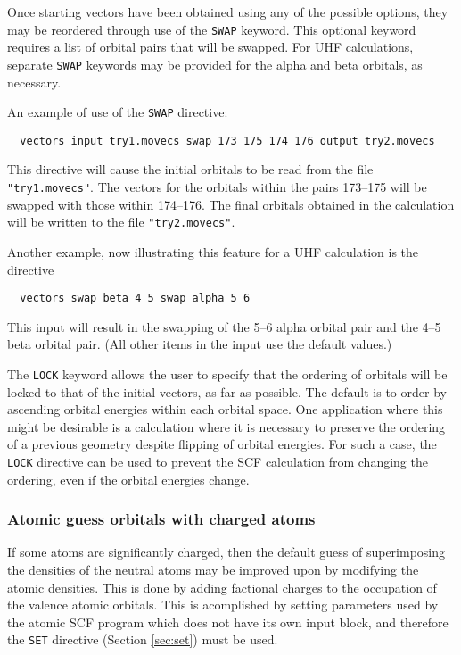 Once starting vectors have been obtained using any of the possible
options, they may be reordered through use of the \verb+SWAP+ keyword.
This optional keyword requires a list of orbital pairs that will be
swapped.  For UHF calculations, separate \verb+SWAP+ keywords may be
provided for the alpha and beta orbitals, as necessary.  

An example of use of the \verb+SWAP+ directive:
\begin{verbatim}
  vectors input try1.movecs swap 173 175 174 176 output try2.movecs
\end{verbatim}
This directive will cause the initial orbitals to be read from the
file \verb+"try1.movecs"+.  The vectors for the orbitals within the
pairs 173--175 will be swapped with those within 174--176.  The final
orbitals obtained in the calculation will be written to the file
\verb+"try2.movecs"+.

Another example, now illustrating this feature for a UHF calculation
is the directive
\begin{verbatim}
  vectors swap beta 4 5 swap alpha 5 6
\end{verbatim}
This input will result in the swapping of the 5--6 alpha orbital pair and 
the 4--5 beta orbital pair.  (All other items in the input use the
default values.)

The \verb+LOCK+ keyword allows the user to specify that the ordering
of orbitals will be locked to that of the initial vectors, as far as
possible. The default is to order by ascending orbital energies within
each orbital space. One application where this might be desirable is a
calculation where it is necessary to preserve the ordering of a
previous geometry despite flipping of orbital energies.  For such a
case, the \verb+LOCK+ directive can be used to prevent the SCF
calculation from changing the ordering, even if the orbital energies
change.

\subsubsection{Atomic guess orbitals with charged atoms}

If some atoms are significantly charged, then the default guess of
superimposing the densities of the neutral atoms may be improved upon
by modifying the atomic densities.  This is done by adding factional
charges to the occupation of the valence atomic orbitals.  This is
acomplished by setting parameters used by the atomic SCF program which
does not have its own input block, and therefore the \verb+SET+
directive (Section \ref{sec:set}) must be used.

